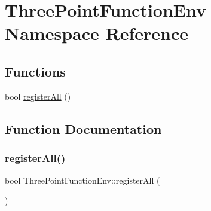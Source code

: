 \hypertarget{namespaceThreePointFunctionEnv}{}\section{Three\+Point\+Function\+Env Namespace Reference}
\label{namespaceThreePointFunctionEnv}
\subsection*{Functions}
\begin{DoxyCompactItemize}
\item 
bool \mbox{\hyperlink{namespaceThreePointFunctionEnv_abdb789af6b21bd1a942b31da7b443b1b}{register\+All}} ()
\end{DoxyCompactItemize}


\subsection{Function Documentation}
\mbox{\label{namespaceThreePointFunctionEnv_abdb789af6b21bd1a942b31da7b443b1b}} 
\subsubsection{\texorpdfstring{registerAll()}{registerAll()}}
{\footnotesize\ttfamily bool Three\+Point\+Function\+Env\+::register\+All (\begin{DoxyParamCaption}{ }\end{DoxyParamCaption})}


